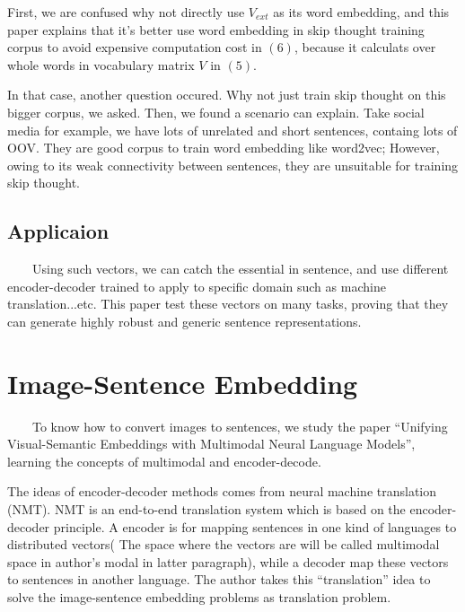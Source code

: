 \documentclass{article}
\begin{document}
\par First, we are confused why not directly use $V_{ext}$ as its word embedding, and this paper explains that it's better use word embedding in skip thought training corpus to avoid expensive computation cost in $(6)$, because it calculats over whole words in vocabulary matrix $V$ in $(5)$.
\newline

\par In that case, another question occured. Why not just train skip thought on this bigger corpus, we asked. Then, we found a scenario can explain. Take social media for example, we have lots of unrelated and short sentences, containg lots of OOV. They are good corpus to train word embedding like word2vec; However, owing to its weak connectivity between sentences, they are unsuitable for training skip thought.

\subsection{Applicaion}
	\par~~~~Using such vectors, we can catch the essential in sentence, and use different encoder-decoder trained to apply to specific domain such as machine translation...etc. This paper test these vectors on many tasks, proving that they can generate highly robust and generic sentence representations.



\section{Image-Sentence Embedding}
 
    ~~~~To know how to convert images to sentences, we study the paper “Unifying Visual-Semantic Embeddings with Multimodal Neural Language Models”, learning the concepts of multimodal and encoder-decode.

	The ideas of encoder-decoder methods comes from neural machine translation (NMT). NMT is an end-to-end translation system which is based on the encoder-decoder principle. A encoder is for mapping sentences in one kind of languages to distributed vectors( The space where the vectors are will be called multimodal space in author’s modal in latter paragraph), while a decoder map these vectors to sentences in another language. The author takes this “translation” idea to solve the image-sentence embedding problems as translation problem.
	
\end{document}
